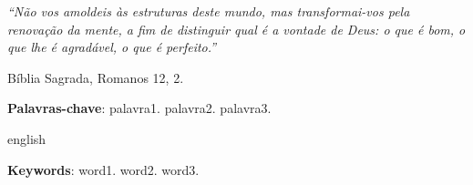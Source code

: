 \documentclass[
	12pt,				%
	openright,			%
	oneside,			%
	a4paper,			%
	english,			%
	french,				%
	spanish,			%
	brazil				%
	]{abntex2}
\begin{document}
\begin{agradecimentos}
	
\lipsum[31-32]

\end{agradecimentos}

\begin{epigrafe}
	\vspace*{\fill}
	\begin{centering}
		\textit{``Não vos amoldeis às estruturas deste mundo, mas transformai-vos pela renovação da mente, a fim de distinguir qual é a vontade de Deus: o que é bom, o que lhe é agradável, o que é perfeito.''}
	\end{centering}
	\flushright Bíblia Sagrada, Romanos 12, 2.
\end{epigrafe}


\setlength{\absparsep}{18pt} %
\begin{resumo}

\lipsum[32]

 \textbf{Palavras-chave}: palavra1. palavra2. palavra3.
\end{resumo}

\begin{resumo}[Abstract]
 \begin{otherlanguage*}{english}
 	
   \lipsum[33]

   \vspace{\onelineskip}
 
   \noindent 
   \textbf{Keywords}: word1. word2. word3.
 \end{otherlanguage*}
\end{resumo}

\begin{comment}
	\begin{resumo}[Résumé]
	\begin{otherlanguage*}{french}
	Il s'agit d'un résumé en français.
	
	\textbf{Mots-clés}: latex. abntex. publication de textes.
	\end{otherlanguage*}
	\end{resumo}
	
	\begin{resumo}[Resumen]
	\begin{otherlanguage*}{spanish}
	Este es el resumen en español.
	
	\textbf{Palabras clave}: latex. abntex. publicación de textos.
	\end{otherlanguage*}
	\end{resumo}
	
\end{comment}
\end{document}
